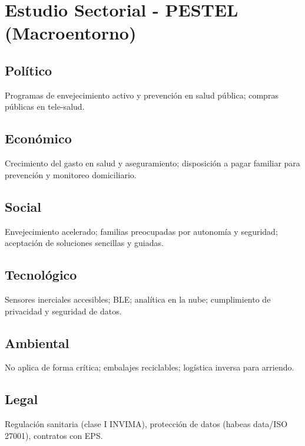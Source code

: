 \section{Estudio Sectorial - PESTEL (Macroentorno)}
\subsection{Político}
Programas de envejecimiento activo y prevención en salud pública; compras públicas en tele-salud.

\subsection{Económico}
Crecimiento del gasto en salud y aseguramiento; disposición a pagar familiar para prevención y monitoreo domiciliario.

\subsection{Social}
Envejecimiento acelerado; familias preocupadas por autonomía y seguridad; aceptación de soluciones sencillas y guiadas.

\subsection{Tecnológico}
Sensores inerciales accesibles; BLE; analítica en la nube; cumplimiento de privacidad y seguridad de datos.

\subsection{Ambiental}
No aplica de forma crítica; embalajes reciclables; logística inversa para arriendo.

\subsection{Legal}
Regulación sanitaria (clase I INVIMA), protección de datos (habeas data/ISO 27001), contratos con EPS.
